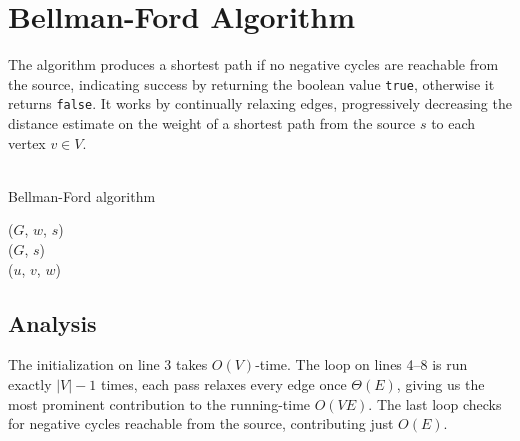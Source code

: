 \section{Bellman-Ford Algorithm}
The algorithm produces a shortest path if no negative cycles are reachable
from the source, indicating success by returning the boolean value
\texttt{true}, otherwise it returns \texttt{false}. It works by continually
relaxing edges, progressively decreasing the distance estimate on the weight
of a shortest path from the source $s$ to each vertex $v \in V$.
\\\\
\begin{algorithm}[H]
	\caption{Bellman-Ford algorithm}
	\label{alg:bellman-ford}
	
	
	
	
	
	\BlankLine
	\BellmanFord($G$, $w$, $s$) \\
	\Begin
	{
		\InitSingleSource($G$, $s$) \\
		{
			{
				\Relax($u$, $v$, $w$)
			}
		}
		{
		}
		\Return \True
	}
\end{algorithm}

\subsection{Analysis}
The initialization on line 3 takes $O(V)$-time. The loop on lines 4--8 is run
exactly $|V|-1$ times, each pass relaxes every edge once $\Theta(E)$, giving
us the most prominent contribution to the running-time $O(VE)$. The last loop
checks for negative cycles reachable from the source, contributing just $O(E)$.

\newpage
